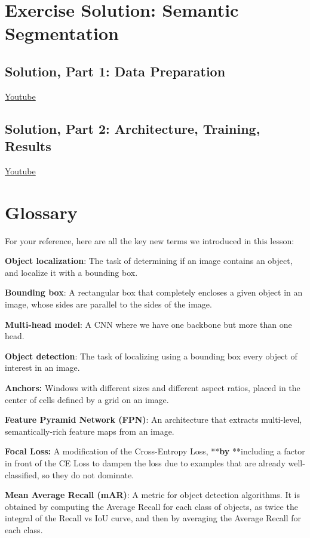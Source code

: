 \section{Exercise Solution: Semantic Segmentation}

\subsection{Solution, Part 1: Data Preparation}
\href{https://www.youtube.com/watch?v=MxdCYmnUSnQ&t=1s}{Youtube}

\subsection{Solution, Part 2: Architecture, Training, Results}
\href{https://www.youtube.com/watch?v=Mz0UodyanGA&t=1s}{Youtube}


\section{Glossary}

For your reference, here are all the key new terms we introduced in this lesson:

\textbf{Object localization}: The task of determining if an image contains an object, and localize it with a bounding box.

\textbf{Bounding box}: A rectangular box that completely encloses a given object in an image, whose sides are parallel to the sides of the image.

\textbf{Multi-head model}: A CNN where we have one backbone but more than one head.

\textbf{Object detection}: The task of localizing using a bounding box every object of interest in an image.

\textbf{Anchors:} Windows with different sizes and different aspect ratios, placed in the center of cells defined by a grid on an image.

\textbf{Feature Pyramid Network (FPN)}: An architecture that extracts multi-level, semantically-rich feature maps from an image.

\textbf{Focal Loss:} A modification of the Cross-Entropy Loss, **\textbf{by} **including a factor in front of the CE Loss to dampen the loss due to examples that are already well-classified, so they do not dominate.

\textbf{Mean Average Recall (mAR)}: A metric for object detection algorithms. It is obtained by computing the Average Recall for each class of objects, as twice the integral of the Recall vs IoU curve, and then by averaging the Average Recall for each class.

